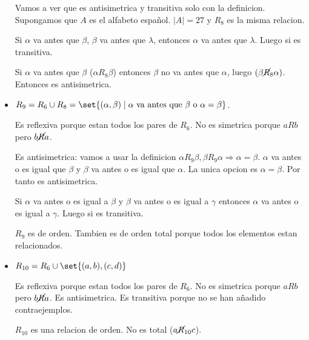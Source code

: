 \begin{example}
\begin{itemize}
		      Vamos a ver que es antisimetrica y transitiva solo con la definicion. Supongamos que \(A \) es el alfabeto español. \(|A| = 27 \) y \(R_8 \) es la misma relacion.

		      Si \(\alpha\) va antes que \(\beta\), \(\beta\) va antes que \(\lambda\), entonces \(\alpha\) va antes que \(\lambda\). Luego si es transitiva.

		      Si \(\alpha\) va antes que \(\beta\) (\(\alpha R_8 \beta\)) entonces \(\beta\) no va antes que \(\alpha\), luego \((\beta \cancel R_8 \alpha)\). Entonces es antisimetrica.

		\item \(R_9 = R_6 \cup R_8 = \set{(\alpha, \beta) \mid \alpha \text{ va antes que } \beta \text{ o } \alpha = \beta }\).

		      Es reflexiva porque estan todos los pares de \(R_{6 }\). No es simetrica porque \(aRb \) pero \(b \cancel R a\).

		      Es antisimetrica: vamos a usar la definicion \(\alpha R_9 \beta, \beta R_9 \alpha \Rightarrow \alpha = \beta\). \(\alpha\) va antes o es igual que \(\beta\) y \(\beta\) va antes o es igual que \(\alpha\). La unica opcion es \(\alpha = \beta\). Por tanto es antisimetrica.

		      Si \(\alpha\) va antes o es igual a \(\beta\) y \(\beta \) va antes o es igual a \(\gamma\) entonces \(\alpha\) va antes o es igual a \(\gamma\). Luego si es transitiva.

		      \(R_9 \) es de orden. Tambien es de orden total porque todos los elementos estan relacionados.

		\item \(R_{10} = R_6 \cup \set{(a,b), (c,d)}\)

		      Es reflexiva porque estan todos los pares de \(R_6\). No es simetrica porque \(aRb \) pero \(b \cancel R a \). Es antisimetrica. Es transitiva porque no se han añadido contraejemplos.

		      \(R_{10 }\) es una relacion de orden. No es total (\(a \cancel R_{10} c \)).
	\end{itemize}

\end{example}

